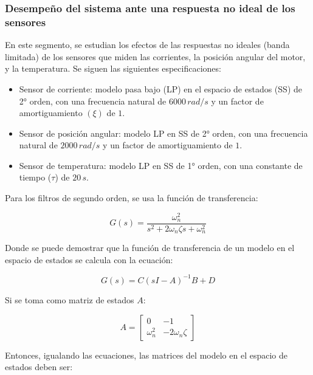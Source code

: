 \documentclass{article}
\begin{document}

\subsubsection{Desempeño del sistema ante una respuesta no ideal de los sensores}

En este segmento, se estudian los efectos de las respuestas no ideales (banda limitada) de los 
sensores que miden las corrientes, la posición angular del motor, y la temperatura. Se siguen las 
siguientes especificaciones:

\begin{itemize}
    \item Sensor de corriente: modelo pasa bajo (LP) en el espacio de estados (SS) de 2° orden, 
    con una frecuencia natural de $6000\,rad/s$ y un factor de amortiguamiento $(\xi)$ de $1$.

    \item Sensor de posición angular: modelo LP en SS de 2° orden, con una frecuencia natural de 
    $2000\,rad/s$ y un factor de amortiguamiento de $1$.

    \item Sensor de temperatura: modelo LP en SS de 1° orden, con una constante de tiempo ($\tau$)  
    de $20\,s$.
\end{itemize}

Para los filtros de segundo orden, se usa la función de transferencia:

\begin{equation*}
    G(s) = \frac{\omega_n^2}{s^2 + 2\omega_n\zeta s + \omega_n^2}
\end{equation*}

Donde se puede demostrar que la función de transferencia de un modelo en el espacio de estados se 
calcula con la ecuación:

\begin{equation*}
    G(s) = C(sI - A)^{-1}B + D
\end{equation*}

Si se toma como matriz de estados $A$:

\[
A = \begin{bmatrix}
0 & -1 \\
\omega_n^2 & -2\omega_n\zeta
\end{bmatrix}
\]

Entonces, igualando las ecuaciones, las matrices del modelo en el espacio de estados deben ser:
\end{document}
